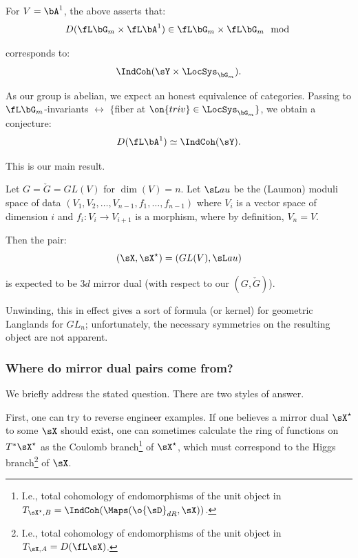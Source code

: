 \begin{example}[Tate]
\notready

For $V = \bA^1$,
the above asserts that:
%
\[
D(\fL\bG_m \times \fL \bA^1) \in \fL \bG_m \times \fL \bG_m \mod
\]

 corresponds to:
%
\[
\IndCoh(\sY \times \LocSys_{\bG_m}).
\]

 As our group is abelian, we expect an honest equivalence
of categories. Passing to $\fL\bG_m$-invariants $\leftrightarrow$
$\{$fiber at $\on{triv} \in \LocSys_{\bG_m}\}$, we obtain a conjecture:
%
\[
D(\fL \bA^1) \simeq \IndCoh(\sY).
\]

 This is our main result.

\end{example}

\begin{example}
\notready

Let $G = \check{G} = GL(V)$ for $\dim(V) = n$.
Let ${\sL au}$ be the (Laumon) moduli space
of data $(V_1,V_2,\ldots,V_{n-1},f_1,\ldots,f_{n-1})$ where
$V_i$ is a vector space of dimension $i$ and $f_i:V_i \to V_{i+1}$ is a
morphism, where by definition, $V_n = V$.

Then the pair:
%
\[
(\sX,\sX^{\star}) = (GL(V),{\sL au})
\]

 is expected to be $3d$ mirror dual (with respect to our $(G,\check{G})$).

Unwinding, this in effect gives a sort of formula (or kernel) for
geometric Langlands for $GL_n$; unfortunately, the necessary symmetries on the
resulting object are not apparent.

\end{example}

\subsubsection{Where do mirror dual pairs come from?}

We briefly address the stated question. There are two styles of answer.

First, one can try to reverse engineer examples. If one believes a mirror
dual $\sX^{\star}$ to some $\sX$ should exist,
one can sometimes calculate the ring of
functions on $T^*{\sX^{\star}}$ as the Coulomb
branch\footnote{I.e., total cohomology of endomorphisms of the unit object
in $T_{\sX^{\star},B} = \IndCoh(\Maps(\o{\sD}_{dR},\sX))$.} of $\sX^{\star}$,
which must correspond to the Higgs branch\footnote{I.e., total cohomology
of endomorphisms of the unit object
in $T_{\sX,A} = D(\fL \sX)$.} of $\sX$.

